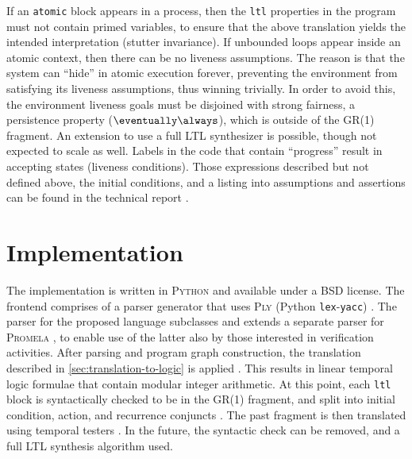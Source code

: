 \documentclass[copyright]{eptcs}
\begin{document}
If an \texttt{atomic} block appears in a process, then the \texttt{ltl} properties in the program must not contain primed variables, to ensure that the above translation yields the intended interpretation (stutter invariance).
If unbounded loops appear inside an atomic context, then there can be no liveness assumptions.
The reason is that the system can “hide” in atomic execution forever, preventing the environment from satisfying its liveness assumptions, thus winning trivially.
In order to avoid this, the environment liveness goals must be disjoined with strong fairness, a persistence property ($\eventually \always$), which is outside of the GR(1) fragment.
An extension to use a full LTL synthesizer is possible, though not expected to scale as well.
Labels in the code that contain “progress” result in accepting states (liveness conditions).
Those expressions described but not defined above, the initial conditions, and a listing into assumptions and assertions can be found in the technical report \cite{Filippidis15cds3-synt}.
\clearpage{}
\clearpage{}\section{Implementation}
\label{sec:implementation}

The implementation is written in \textsc{Python} and available \cite{Filippidis15github-openpromela,Filippidis15github-promela,Filippidis15github-omega} under a BSD license.
The frontend comprises of a parser generator that uses \textsc{Ply} (Python \texttt{lex}-\texttt{yacc}) \cite{ply34doc}.
The parser for the proposed language subclasses and extends a separate parser for \textsc{Promela} \cite{Filippidis15github-promela}, to enable use of the latter also by those interested in verification activities.
After parsing and program graph construction, the translation described in \cref{sec:translation-to-logic} is applied \cite{Filippidis15github-openpromela}.
This results in linear temporal logic formulae that contain modular integer arithmetic.
At this point, each \texttt{ltl} block is syntactically checked to be in the GR(1) fragment, and split into initial condition, action, and recurrence conjuncts \cite{Filippidis15github-omega}.
The past fragment is then translated using temporal testers \cite{Kesten1998icalp}.
In the future, the syntactic check can be removed, and a full LTL synthesis algorithm used.
\end{document}
